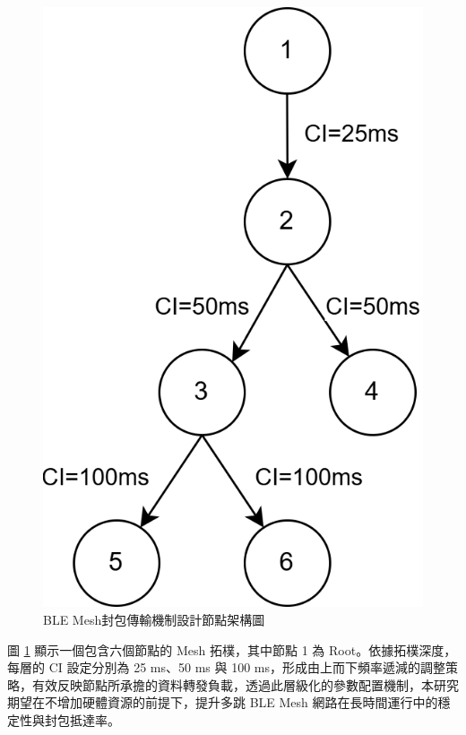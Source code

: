 \begin{ZhChapter}
\begin{figure}[H]
    \centering
    \includegraphics[width = 1\textwidth]{image/BLE Mesh封包傳輸機制設計節點架構圖.png}
    \caption{BLE Mesh封包傳輸機制設計節點架構圖}
    \label{fig: BLE Mesh封包傳輸機制設計節點架構圖}
\end{figure}

圖 \ref{fig: BLE Mesh封包傳輸機制設計節點架構圖} 顯示一個包含六個節點的 Mesh 拓樸，其中節點 1 為 Root。依據拓樸深度，每層的 CI 設定分別為 25 ms、50 ms 與 100 ms，形成由上而下頻率遞減的調整策略，有效反映節點所承擔的資料轉發負載，透過此層級化的參數配置機制，本研究期望在不增加硬體資源的前提下，提升多跳 BLE Mesh 網路在長時間運行中的穩定性與封包抵達率。

\end{ZhChapter}